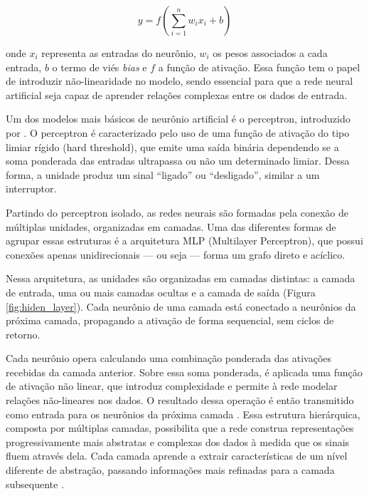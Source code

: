 \[
y = f\left(\sum_{i=1}^{n} w_i x_i + b\right)
\]

onde \(x_i\) representa as entradas do neurônio, \(w_i\) os pesos associados a cada entrada, \(b\) o termo de viés \textit{bias} e \(f\) a função de ativação. Essa função tem o papel de introduzir não-linearidade no modelo, sendo essencial para que a rede neural artificial seja capaz de aprender relações complexas entre os dados de entrada.

Um dos modelos mais básicos de neurônio artificial é o perceptron, introduzido por \cite{rosenblatt_perceptron:_1958}. O perceptron é caracterizado pelo uso de uma função de ativação do tipo limiar rígido (hard threshold), que emite uma saída binária dependendo se a soma ponderada das entradas ultrapassa ou não um determinado limiar. Dessa forma, a unidade produz um sinal “ligado” ou “desligado”, similar a um interruptor.

Partindo do perceptron isolado, as redes neurais são formadas pela conexão de múltiplas unidades, organizadas em camadas. Uma das diferentes formas de agrupar essas estruturas é a arquitetura MLP (Multilayer Perceptron), que possui conexões apenas unidirecionais --- ou seja --- forma um grafo direto e acíclico.

Nessa arquitetura, as unidades são organizadas em camadas distintas: a camada de entrada, uma ou mais camadas ocultas e a camada de saída (Figura \ref{fig:hiden_layer}). Cada neurônio de uma camada está conectado a neurônios da próxima camada, propagando a ativação de forma sequencial, sem ciclos de retorno.

\begin{figure}[h!]
		\centering
\end{figure}

 Cada neurônio opera calculando uma combinação ponderada das ativações recebidas da camada anterior. Sobre essa soma ponderada, é aplicada uma função de ativação não linear, que introduz complexidade e permite à rede modelar relações não-lineares nos dados. O resultado dessa operação é então transmitido como entrada para os neurônios da próxima camada \cite{russell_artificial_2016}. Essa estrutura hierárquica, composta por múltiplas camadas, possibilita que a rede construa representações progressivamente mais abstratas e complexas dos dados à medida que os sinais fluem através dela. Cada camada aprende a extrair características de um nível diferente de abstração, passando informações mais refinadas para a camada subsequente \cite{goodfellow_deep_2016}.

